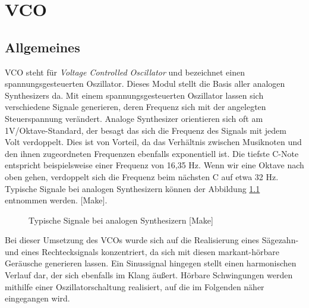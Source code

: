 \chapter{VCO}
\label{ch:VCO}
\section{Allgemeines}

VCO steht für \textit{Voltage Controlled Oscillator} und bezeichnet einen spannungsgesteuerten Oszillator.
Dieses Modul stellt die Basis aller analogen Synthesizers da. 
Mit einem spannungsgesteuerten Oszillator lassen sich verschiedene Signale generieren, deren Frequenz sich mit der angelegten Steuerspannung verändert.
Analoge Synthesizer orientieren sich oft am 1V/Oktave-Standard, der besagt das sich die Frequenz des Signals mit jedem Volt verdoppelt.
Dies ist von Vorteil, da das Verhältnis zwischen Musiknoten und den ihnen zugeordneten Frequenzen ebenfalls exponentiell ist.
Die tiefste C-Note entspricht beispielsweise einer Frequenz von 16,35 Hz.
Wenn wir eine Oktave nach oben gehen, verdoppelt sich die Frequenz beim nächsten C auf etwa 32 Hz. Typische Signale bei analogen Synthesizern können der Abbildung \ref{fig:Waveforms} entnommen werden. [Make]. 

\begin{figure}[h]
	\centering
	\setlength{\fboxsep}{1pt} %
	\setlength{\fboxrule}{1pt} %
	\caption{Typische Signale bei analogen Synthesizern [Make]}
	\label{fig:Waveforms}
\end{figure}

Bei dieser Umsetzung des VCOs wurde sich auf die Realisierung eines Sägezahn- und eines Rechtecksignals konzentriert, da sich mit diesen markant-hörbare Geräusche generieren lassen.
Ein Sinussignal hingegen stellt einen harmonischen Verlauf dar, der sich ebenfalls im Klang äußert.
Hörbare Schwingungen werden mithilfe einer Oszillatorschaltung realisiert, auf die im Folgenden näher eingegangen wird.

